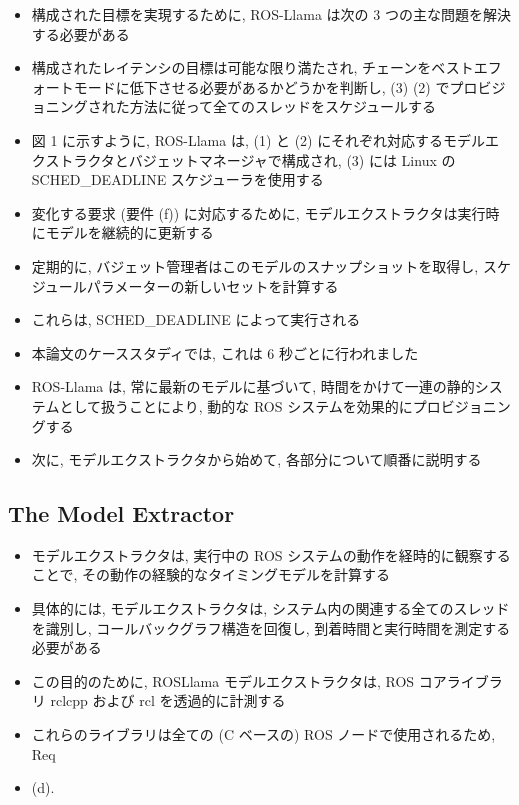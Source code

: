 \begin{frame}{}
    \begin{itemize}
        \item 構成された目標を実現するために, ROS-Llama は次の 3 つの主な問題を解決する必要がある
\item 構成されたレイテンシの目標は可能な限り満たされ, チェーンをベストエフォートモードに低下させる必要があるかどうかを判断し, (3) (2) でプロビジョニングされた方法に従って全てのスレッドをスケジュールする
    \end{itemize}
\end{frame}

\begin{frame}{}
    \begin{itemize}
        \item 図 1 に示すように, ROS-Llama は, (1) と (2) にそれぞれ対応するモデルエクストラクタとバジェットマネージャで構成され, (3) には Linux の SCHED\_DEADLINE スケジューラを使用する
\item 変化する要求 (要件 (f)) に対応するために, モデルエクストラクタは実行時にモデルを継続的に更新する
\item 定期的に, バジェット管理者はこのモデルのスナップショットを取得し, スケジュールパラメーターの新しいセットを計算する
\item これらは, SCHED\_DEADLINE によって実行される
\item 本論文のケーススタディでは, これは 6 秒ごとに行われました
\item ROS-Llama は, 常に最新のモデルに基づいて, 時間をかけて一連の静的システムとして扱うことにより, 動的な ROS システムを効果的にプロビジョニングする
\item 次に, モデルエクストラクタから始めて, 各部分について順番に説明する
    \end{itemize}
\end{frame}


\subsection{The Model Extractor}
\label{ssec: the model extractor}

\begin{frame}{}
    \begin{itemize}
        \item モデルエクストラクタは, 実行中の ROS システムの動作を経時的に観察することで, その動作の経験的なタイミングモデルを計算する
\item 具体的には, モデルエクストラクタは, システム内の関連する全てのスレッドを識別し, コールバックグラフ構造を回復し, 到着時間と実行時間を測定する必要がある
\item この目的のために, ROSLlama モデルエクストラクタは, ROS コアライブラリ $\mathrm{rclcpp}$ および $\mathrm{rcl}$ を透過的に計測する
\item これらのライブラリは全ての (C ベースの) ROS ノードで使用されるため, Req
\item (d).
    \end{itemize}
\end{frame}

